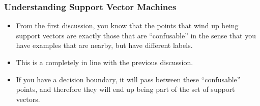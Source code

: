 \documentclass[trans]{beamer}
\begin{document}
\begin{frame}
  \frametitle{Understanding Support Vector Machines}
\begin{itemize}
\item 
From the first discussion, you know that the points that wind up being
support vectors are exactly those that are ``confusable'' in the sense
that you have  examples that are nearby, but have different labels.
\item
This is a completely in line with the previous discussion.  
\item If you
have a decision boundary, it will pass between these ``confusable''
points, and therefore they will end up being part of the set of
support vectors.
\end{itemize}
\end{frame}
\end{document}
